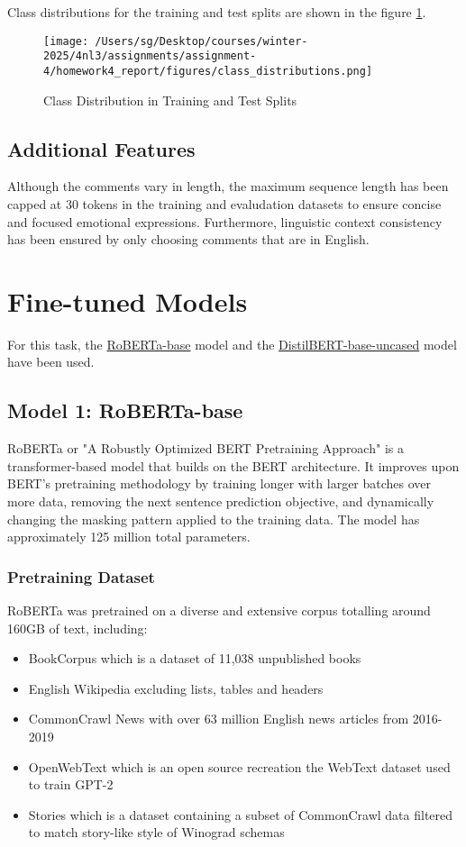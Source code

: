 \documentclass[titlepage]{article}
\begin{document}
Class distributions for the training and test splits are shown in the figure \ref{fig:class_distribution}.

\begin{figure}[H] \label{fig:class_distribution}
    \centering
    \texttt{[image: /Users/sg/Desktop/courses/winter-2025/4nl3/assignments/assignment-4/homework4\_report/figures/class\_distributions.png]}
    \caption{Class Distribution in Training and Test Splits}
\end{figure}

\subsection{Additional Features}
Although the comments vary in length, the maximum sequence length has been capped at 30 tokens in the training and evaludation datasets 
to ensure concise and focused emotional expressions. Furthermore, linguistic context consistency has been ensured by only choosing comments 
that are in English.
 
\section{Fine-tuned Models}
For this task, the \href{https://huggingface.co/FacebookAI/roberta-base}{RoBERTa-base} model and the \href{https://huggingface.co/distilbert/distilbert-base-uncased}
{DistilBERT-base-uncased} model have been used. 

\subsection{Model 1: RoBERTa-base}
RoBERTa or "A Robustly Optimized BERT Pretraining Approach" is a transformer-based model that builds on the BERT architecture. It improves upon 
BERT's pretraining methodology by training longer with larger batches over more data, removing the next sentence prediction objective, and dynamically 
changing the masking pattern applied to the training data. The model has approximately 125 million total parameters. 

\subsubsection{Pretraining Dataset}
RoBERTa was pretrained on a diverse and extensive corpus totalling around 160GB of text, including:
\begin{itemize}
    \item BookCorpus which is a dataset of 11,038 unpublished books 
    \item English Wikipedia excluding lists, tables and headers 
    \item CommonCrawl News with over 63 million English news articles from 2016-2019 
    \item OpenWebText which is an open source recreation the WebText dataset used to train GPT-2 
    \item Stories which is a dataset containing a subset of CommonCrawl data filtered to match story-like style of Winograd schemas
\end{itemize}
\end{document}
